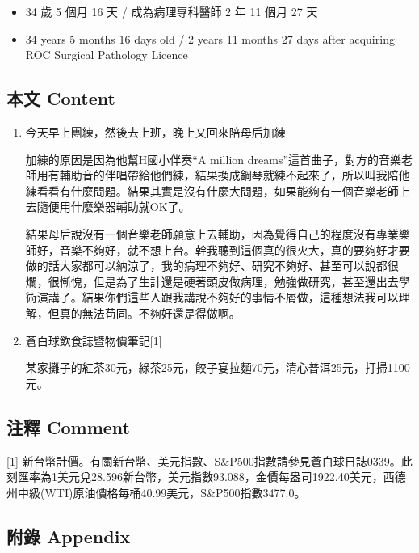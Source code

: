 \documentclass[a5paper, 11pt
]{book}
\providecommand{\tightlist}{%
  \setlength{\itemsep}{0pt}\setlength{\parskip}{0pt}}
\begin{document}
\begin{itemize}
\tightlist
\item
  34 歲 5 個月 16 天 / 成為病理專科醫師 2 年 11 個月 27 天
\item
  34 years 5 months 16 days old / 2 years 11 months 27 days after
  acquiring ROC Surgical Pathology Licence
\end{itemize}

\hypertarget{ux672cux6587-content-36}{%
\subsection{本文 Content}\label{ux672cux6587-content-36}}

\begin{enumerate}
\def\labelenumi{\arabic{enumi}.}
\item
  今天早上團練，然後去上班，晚上又回來陪母后加練

  加練的原因是因為他幫H國小伴奏``A million
  dreams''這首曲子，對方的音樂老師用有輔助音的伴唱帶給他們練，結果換成鋼琴就練不起來了，所以叫我陪他練看看有什麼問題。結果其實是沒有什麼大問題，如果能夠有一個音樂老師上去隨便用什麼樂器輔助就OK了。

  結果母后說沒有一個音樂老師願意上去輔助，因為覺得自己的程度沒有專業樂師好，音樂不夠好，就不想上台。幹我聽到這個真的很火大，真的要夠好才要做的話大家都可以納涼了，我的病理不夠好、研究不夠好、甚至可以說都很爛，很慚愧，但是為了生計還是硬著頭皮做病理，勉強做研究，甚至還出去學術演講了。結果你們這些人跟我講說不夠好的事情不屑做，這種想法我可以理解，但真的無法苟同。不夠好還是得做啊。
\item
  蒼白球飲食誌暨物價筆記{[}1{]}

  某家攤子的紅茶30元，綠茶25元，餃子宴拉麵70元，清心普洱25元，打掃1100元。
\end{enumerate}

\hypertarget{ux6ce8ux91cb-comment-36}{%
\subsection{注釋 Comment}\label{ux6ce8ux91cb-comment-36}}

{[}1{]}
新台幣計價。有關新台幣、美元指數、S\&P500指數請參見蒼白球日誌0339。此刻匯率為1美元兌28.596新台幣，美元指數93.088，金價每盎司1922.40美元，西德州中級(WTI)原油價格每桶40.99美元，S\&P500指數3477.0。

\hypertarget{ux9644ux9304-appendix-36}{%
\subsection{附錄 Appendix}\label{ux9644ux9304-appendix-36}}
\end{document}
